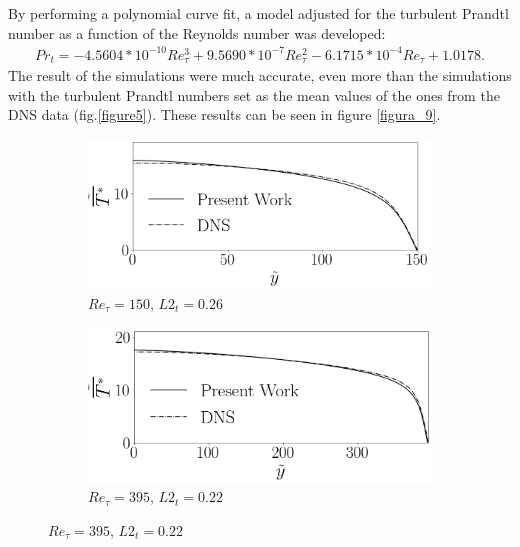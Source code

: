 \documentclass[10pt]{article} %
\begin{document}
By performing a polynomial curve fit, a model adjusted for the turbulent Prandtl number as a function of the Reynolds number was developed:
\begin{equation}
\begin{split}
Pr_t = -4.5604 * 10^{-10} Re_\tau^3 + 9.5690 * 10^{-7} Re_\tau^2 - 6.1715 *10 ^{-4} Re_\tau + 1.0178 .
\end{split}
\end{equation}
The result of the simulations were much accurate, even more than the simulations with the turbulent Prandtl numbers set as the mean values of the ones from the DNS data (fig.\ref{figure5}). These results can be seen in figure \ref{figura_9}.



\begin{figure}[!h]
	\centering
	\begin{subfigure}[t]{0.5\textwidth}
		\centering
		\includegraphics[angle=0, scale=0.24]{fotos_formatacao_final/Temperature_150_071_Prt(Ret)_A26}
		\caption{$Re_\tau = 150$, $L2_t = 0.26$}
	\end{subfigure}
	\begin{subfigure}[t]{0.45\textwidth}
		\centering
		\includegraphics[angle=0, scale=0.24]{fotos_formatacao_final/Temperature_395_071_Prt(Ret)_A26}
		\caption{$Re_\tau = 395$, $L2_t = 0.22$}
	\end{subfigure}

\end{figure}
\end{document}

